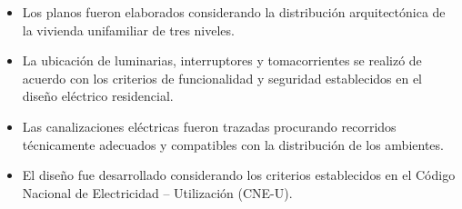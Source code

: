 \begin{itemize}
	\item Los planos fueron elaborados considerando la distribución arquitectónica de la vivienda unifamiliar de tres niveles.
	
	\item La ubicación de luminarias, interruptores y tomacorrientes se realizó de acuerdo con los criterios de funcionalidad y seguridad establecidos en el diseño eléctrico residencial.
	
	\item Las canalizaciones eléctricas fueron trazadas procurando recorridos técnicamente adecuados y compatibles con la distribución de los ambientes.
	
	\item El diseño fue desarrollado considerando los criterios establecidos en el Código Nacional de Electricidad -- Utilización (CNE-U).
\end{itemize}
